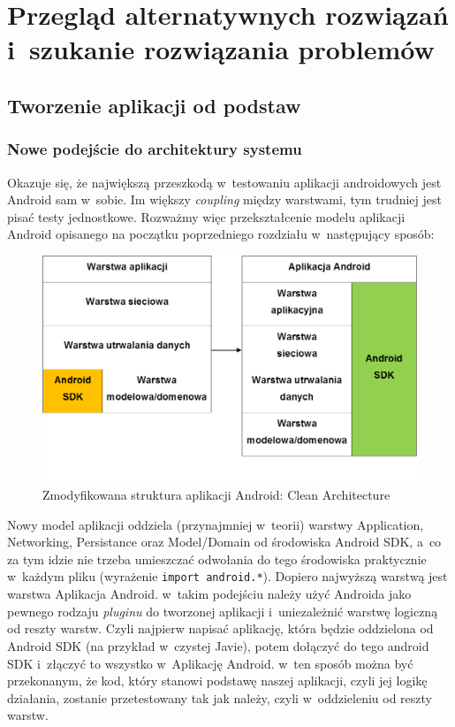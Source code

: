 \chapter{Przegląd alternatywnych rozwiązań \newline i~szukanie  rozwiązania problemów}
\label{propozycja_rozwiazania}

\section{Tworzenie aplikacji od podstaw}
\label{nowa_aplikacja}
\subsection{Nowe podejście do architektury systemu}
\label{clean_architecture}
Okazuje się, że największą przeszkodą w~testowaniu aplikacji androidowych jest Android sam w~sobie. Im większy \textit{coupling} między warstwami, tym trudniej jest pisać testy jednostkowe. Rozważmy więc przekształcenie modelu aplikacji Android opisanego na początku poprzedniego rozdziału w~następujący sposób:

\begin{figure}[!htb]
    \centering
    \includegraphics[width=13cm]{imgs/ch4_opis_rozwiazania_1.png}
    \caption
{Zmodyfikowana struktura aplikacji Android: Clean Architecture}
    \label{fig:opis_rozwiazania}
\end{figure} 

Nowy model aplikacji oddziela (przynajmniej w~teorii) warstwy Application, Networking, Persistance oraz Model/Domain od środowiska Android SDK, a~co za tym idzie nie trzeba umieszczać odwołania do tego środowiska praktycznie w~każdym pliku (wyrażenie \texttt{import android.*}). Dopiero najwyższą warstwą jest warstwa Aplikacja Android. w~takim podejściu należy użyć Androida jako pewnego rodzaju \textit{pluginu} do tworzonej aplikacji i~uniezależnić warstwę logiczną od reszty warstw. Czyli najpierw napisać aplikację, która będzie oddzielona od Android SDK (na przykład w~czystej Javie), potem dołączyć do tego android SDK i~złączyć to wszystko w~Aplikację Android. w~ten sposób można być przekonanym, że kod, który stanowi podstawę naszej aplikacji, czyli jej logikę działania, zostanie przetestowany tak jak należy, czyli w~oddzieleniu od reszty warstw.


